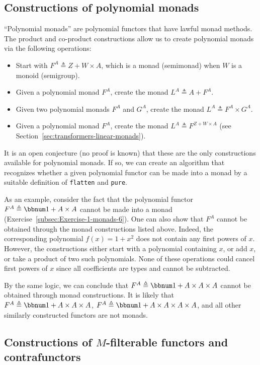 \subsection{Constructions of polynomial monads\label{subsec:Constructions-of-polynomial-monads}}

\textsf{``}Polynomial monads\textsf{''} are polynomial functors that have lawful monad
methods. The product and co-product constructions allow us to create
polynomial monads via the following operations:
\begin{itemize}
\item Start with $F^{A}\triangleq Z+W\times A$, which is a monad (semimonad)
when $W$ is a monoid (semigroup).
\item Given a polynomial monad $F^{A}$, create the monad $L^{A}\triangleq A+F^{A}$.
\item Given two polynomial monads $F^{A}$ and $G^{A}$, create the monad
$L^{A}\triangleq F^{A}\times G^{A}$.
\item Given a polynomial monad $F^{A}$, create the monad $L^{A}\triangleq F^{Z+W\times A}$
(see Section~\ref{sec:transformers-linear-monads}).
\end{itemize}
It is an open conjecture (no proof is known) that these are the only
constructions available for polynomial monads. If so, we can create
an algorithm that recognizes whether a given polynomial functor can
be made into a monad by a suitable definition of \lstinline!flatten!
and \lstinline!pure!. 

As an example, consider the fact that the polynomial functor $F^{A}\triangleq\bbnum 1+A\times A$
cannot be made into a monad (Exercise~\ref{subsec:Exercise-1-monads-6}).
One can also show that $F^{A}$ cannot be obtained through the monad
constructions listed above. Indeed, the corresponding polynomial $f(x)=1+x^{2}$
does not contain any first powers of $x$. However, the constructions
either start with a polynomial containing $x$, or add $x$, or take
a product of two such polynomials. None of these operations could
cancel first powers of $x$ since all coefficients are types and cannot
be subtracted.

By the same logic, we can conclude that $F^{A}\triangleq\bbnum 1+A\times A\times A$
cannot be obtained through monad constructions. It is likely that
$F^{A}\triangleq\bbnum 1+A\times A\times A$, $F^{A}\triangleq\bbnum 1+A\times A\times A\times A$,
and all other similarly constructed functors are not monads.

\subsection{Constructions of $M$-filterable functors and contrafunctors\label{subsec:Constructions-of-M-filterables}}

